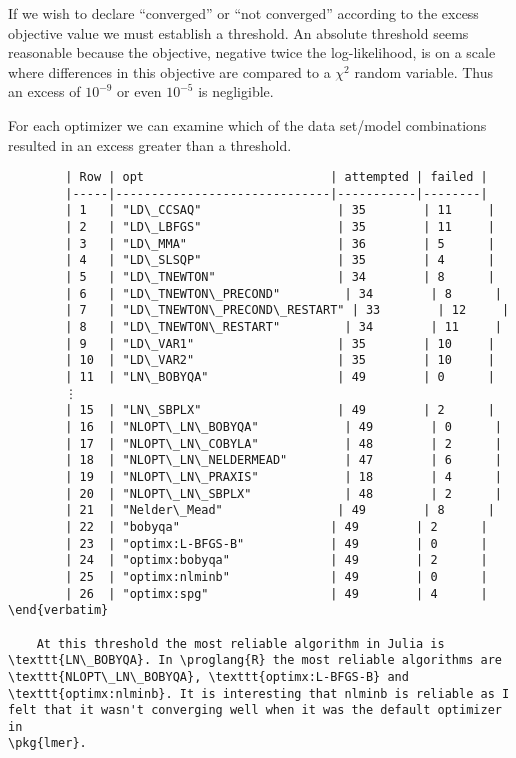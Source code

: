 \documentclass[article]{jss}
\begin{document}
  If we wish to declare ``converged'' or ``not converged'' according to
the excess objective value we must establish a threshold. An absolute
threshold seems reasonable because the objective, negative twice the
log-likelihood, is on a scale where differences in this objective are
compared to a $\chi^2$ random variable. Thus an excess of $10^{-9}$ or
even $10^{-5}$ is negligible.

For each optimizer we can examine which of the data set/model
combinations resulted in an excess greater than a threshold.


            \begin{Verbatim}
        | Row | opt                          | attempted | failed |
        |-----|------------------------------|-----------|--------|
        | 1   | "LD\_CCSAQ"                   | 35        | 11     |
        | 2   | "LD\_LBFGS"                   | 35        | 11     |
        | 3   | "LD\_MMA"                     | 36        | 5      |
        | 4   | "LD\_SLSQP"                   | 35        | 4      |
        | 5   | "LD\_TNEWTON"                 | 34        | 8      |
        | 6   | "LD\_TNEWTON\_PRECOND"         | 34        | 8      |
        | 7   | "LD\_TNEWTON\_PRECOND\_RESTART" | 33        | 12     |
        | 8   | "LD\_TNEWTON\_RESTART"         | 34        | 11     |
        | 9   | "LD\_VAR1"                    | 35        | 10     |
        | 10  | "LD\_VAR2"                    | 35        | 10     |
        | 11  | "LN\_BOBYQA"                  | 49        | 0      |
        ⋮
        | 15  | "LN\_SBPLX"                   | 49        | 2      |
        | 16  | "NLOPT\_LN\_BOBYQA"            | 49        | 0      |
        | 17  | "NLOPT\_LN\_COBYLA"            | 48        | 2      |
        | 18  | "NLOPT\_LN\_NELDERMEAD"        | 47        | 6      |
        | 19  | "NLOPT\_LN\_PRAXIS"            | 18        | 4      |
        | 20  | "NLOPT\_LN\_SBPLX"             | 48        | 2      |
        | 21  | "Nelder\_Mead"                | 49        | 8      |
        | 22  | "bobyqa"                     | 49        | 2      |
        | 23  | "optimx:L-BFGS-B"            | 49        | 0      |
        | 24  | "optimx:bobyqa"              | 49        | 2      |
        | 25  | "optimx:nlminb"              | 49        | 0      |
        | 26  | "optimx:spg"                 | 49        | 4      |
\end{verbatim}

    At this threshold the most reliable algorithm in Julia is
\texttt{LN\_BOBYQA}. In \proglang{R} the most reliable algorithms are
\texttt{NLOPT\_LN\_BOBYQA}, \texttt{optimx:L-BFGS-B} and
\texttt{optimx:nlminb}. It is interesting that nlminb is reliable as I
felt that it wasn't converging well when it was the default optimizer in
\pkg{lmer}.


\end{Verbatim}
\end{document}
